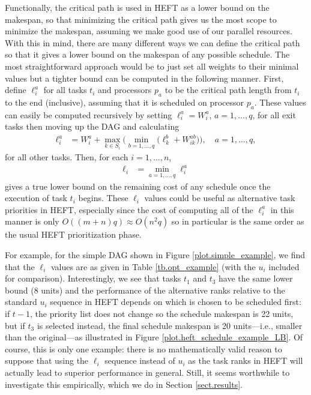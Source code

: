 \documentclass[12pt]{article}
\begin{document}
Functionally, the critical path is used in HEFT as a lower bound on the makespan, so that minimizing the critical path gives us the most scope to minimize the makespan, assuming we make good use of our parallel resources. With this in mind, there are many different ways we can define the critical path so that it gives a lower bound on the makespan of any possible schedule. The most straightforward approach would be to just set all weights to their minimal values but a tighter bound can be computed in the following manner. First, define $\ell_i^a$ for all tasks $t_i$ and processors $p_a$ to be the critical path length from $t_i$ to the end (inclusive), assuming that it is scheduled on processor $p_a$. These values can easily be computed recursively by setting $\ell_i^a = W_i^a$, $a = 1, \dots, q$, for all exit tasks then moving up the DAG and calculating 
\begin{align}
\ell_i^a &= W_i^a + \max_{k \in S_i} \bigg( \min_{b = 1, \dots, q} \big( \ell_k^b + W_{ik}^{ab} \big)  \bigg), \quad a = 1, \dots, q, \label{eq.opt_uia} 
\end{align}
for all other tasks. Then, for each $i = 1, \dots, n$,
\begin{align}
\ell_i &= \min_{a = 1, \dots, q}\ell_i^a \label{eq.opt_ui} 
\end{align}
gives a true lower bound on the remaining cost of any schedule once the execution of task $t_i$ begins. These $\ell_i$ values could be useful as alternative task priorities in HEFT, especially since the cost of computing all of the $\ell_i^a$ in this manner is only $O((m + n)q) \approx O(n^2q)$ so in particular is the same order as the usual HEFT prioritization phase. 

For example, for the simple DAG shown in Figure \ref{plot.simple_example}, we find that the $\ell_i$ values are as given in Table \ref{tb.opt_example} (with the $u_i$ included for comparison). Interestingly, we see that tasks $t_1$ and $t_3$ have the same lower bound (8 units) and the performance of the alternative ranks relative to the standard $u_i$ sequence in HEFT depends on which is chosen to be scheduled first: if $t-1$, the priority list does not change so the schedule makespan is 22 units, but if $t_3$ is selected instead, the final schedule makespan is 20 units---i.e., smaller than the original---as illustrated in Figure \ref{plot.heft_schedule_example_LB}. Of course, this is only one example: there is no mathematically valid reason to suppose that using the $\ell_i$ sequence instead of $u_i$ as the task ranks in HEFT will actually lead to superior performance in general. Still, it seems worthwhile to investigate this empirically, which we do in Section \ref{sect.results}.
\end{document}
